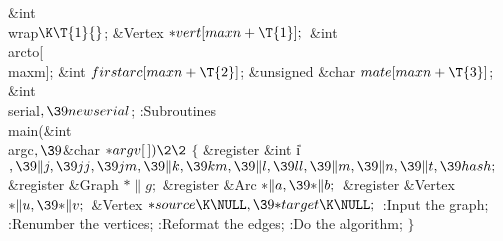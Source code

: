\&{int} \\{wrap}${}\K\T{1}{}$;\6
\&{Vertex} ${}{*}\\{vert}[\\{maxn}+\T{1}];{}$\6
\&{int} \\{arcto}[\\{maxm}];\6
\&{int} ${}\\{firstarc}[\\{maxn}+\T{2}]{}$;\6
\&{unsigned} \&{char} ${}\\{mate}[\\{maxn}+\T{3}]{}$;\6
\&{int} \\{serial}${},\39\\{newserial}{}$;\7
:Subroutines\X\7
\1\1\\{main}(\&{int} \\{argc}${},\39{}$\&{char} ${}{*}\\{argv}[\,])\2\2{}$\6
${}\{{}$\1\6
\&{register} \&{int} \|i${},\39\|j,\39\\{jj},\39\\{jm},\39\|k,\39\\{km},\39\|l,%
\39\\{ll},\39\|m,\39\|n,\39\|t,\39\\{hash};{}$\6
\&{register} \&{Graph} ${}{*}\|g;{}$\6
\&{register} \&{Arc} ${}{*}\|a,\39{*}\|b;{}$\6
\&{register} \&{Vertex} ${}{*}\|u,\39{*}\|v;{}$\6
\&{Vertex} ${}{*}\\{source}\K\NULL,\39{*}\\{target}\K\NULL;{}$\7
:Input the graph\X;\6
:Renumber the vertices\X;\6
:Reformat the edges\X;\6
:Do the algorithm\X;\6
\4${}\}{}$\2\par
\fi

